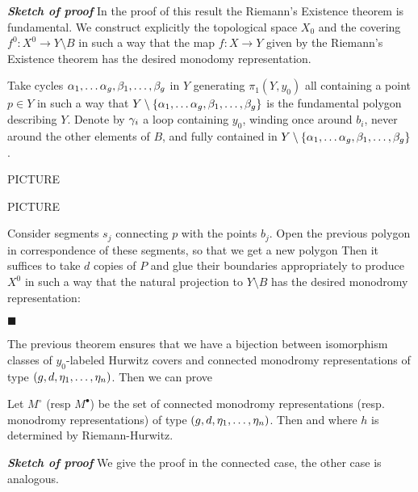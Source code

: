 \documentclass[10pt]{beamer}
\begin{document}
\begin{frame}

\emph{\bf Sketch of proof}
	In the proof of this result the Riemann's Existence theorem is fundamental. We construct explicitly the topological space $X_0$ and the covering $f^0\colon X^0\to Y\setminus B$ in such a way that the map $f\colon X\to Y$ given by the Riemann's Existence theorem has the desired monodomy representation. 
	
	Take cycles $\alpha_1,\ldots\alpha_g,\beta_1,\ldots,\beta_g$ in $Y$ generating $\pi_1(Y,y_0)$ all containing a point $p\in Y$ in such a way that $Y\setminus\{\alpha_1,\ldots\alpha_g,\beta_1,\ldots,\beta_g\}$ is the fundamental polygon describing $Y$. Denote by $\gamma_i$ a loop containing $y_0$, winding once around $b_i$, never around the other elements of $B$, and fully contained in $Y\setminus\{\alpha_1,\ldots\alpha_g,\beta_1,\ldots,\beta_g\}$.
	
	PICTURE
	
\end{frame}

\begin{frame}

	PICTURE
	
	Consider segments $s_j$ connecting $p$ with the points $b_j$. Open the previous polygon in correspondence of these segments, so that we get a new polygon
	Then it suffices to take $d$ copies of $P$ and glue their boundaries appropriately to produce $X^0$ in such a way that the natural projection to $Y\setminus B$ has the desired monodromy representation:

	\hfill$\blacksquare$
\end{frame}

\begin{frame}

The previous theorem ensures that we have a bijection between isomorphism classes of $y_0$-labeled Hurwitz covers and connected monodromy representations of type $(g,d,\eta_1,\ldots,\eta_n)$. Then we can prove

\begin{theorem}
	Let $M^\circ$ (resp $M^\bullet$) be the set of connected monodromy representations (resp. monodromy representations) of type $(g,d,\eta_1,\ldots,\eta_n)$. Then
	and
	where $h$ is determined by Riemann-Hurwitz. 
\end{theorem}

\emph{\bf Sketch of proof}
	We give the proof in the connected case, the other case is analogous. 

\end{frame}
\end{document}
